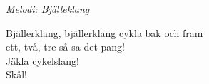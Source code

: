 {\footnotesize\textit{Melodi: Bjälleklang}}\par
\vspace{10pt}
Bjällerklang, bjällerklang cykla bak och fram\\
ett, två, tre så sa det pang!\\
Jäkla cykelslang!\\
Skål!